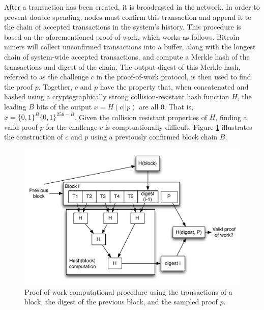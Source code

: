After a transaction has been created, it is broadcasted in the network. In order to prevent double spending, nodes must confirm this transaction and append it to the chain of accepted transactions in the system's history. This procedure is based on the aforementioned proof-of-work, which works as follows. Bitcoin miners will collect unconfirmed transactions into a buffer, along with the longest chain of system-wide accepted transactions, and compute a Merkle hash of the transactions and digest of the chain. The output digest of this Merkle hash, referred to as the challenge $c$ in the proof-of-work protocol, is then used to find the proof $p$. Together, $c$ and $p$ have the property that, when concatenated and hashed using a cryptographically strong collision-resistant hash function $H$, the leading $B$ bits of the output $x = H(c || p)$ are all $0$. That is, $x = \{0,1\}^B\{0,1\}^{256-B}$. Given the collision resistant properties of $H$, finding a valid proof $p$ for the challenge $c$ is comptuationally difficult. Figure \ref{fig:pow} illustrates the construction of $c$ and $p$ using a previously confirmed block chain $B$.

\begin{center}
\begin{figure}
\includegraphics[scale=0.5]{./images/transaction_pow.pdf}
\caption{Proof-of-work computational procedure using the transactions of a block, the digest of the previous block, and the sampled proof $p$.}
\label{fig:pow}
\end{figure}
\end{center}

